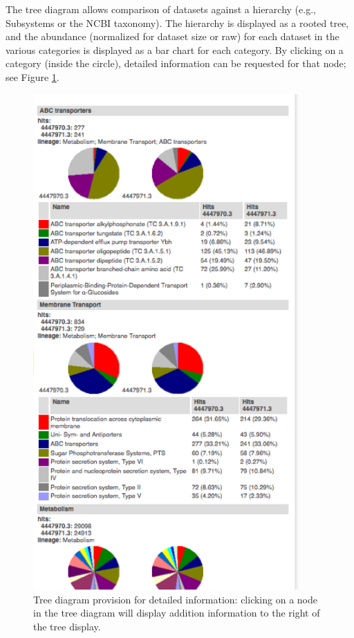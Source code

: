 \documentclass[12pt,fullpage]{report}
\begin{document}
The tree diagram allows comparison of datasets against a hierarchy (e.g., \gls{Subsystem}s or the NCBI taxonomy).
The hierarchy is displayed as a rooted tree, and the abundance (normalized for dataset size or raw) for each dataset in the various categories is displayed as a bar chart for each category.
By clicking on a category (inside the circle), detailed information can be requested for that node; see Figure \ref{fig:analysis-page-tree-additional-bar-charts}.

\begin{figure}
\begin{center}
\includegraphics[width=4in]{Images/analysis-page-tree-additional-bar-charts.png}
\end{center}
\caption{
Tree diagram provision for detailed information: 
clicking on a node in the tree diagram will display addition information to the right of the tree display.
}
\label{fig:analysis-page-tree-additional-bar-charts}
\end{figure}
\end{document}
